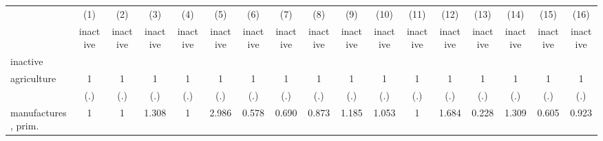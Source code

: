 {
\def\sym#1{\ifmmode^{#1}\else\(^{#1}\)\fi}
\begin{tabular}{l*{16}{c}}
\hline\hline
                    &\multicolumn{1}{c}{(1)}&\multicolumn{1}{c}{(2)}&\multicolumn{1}{c}{(3)}&\multicolumn{1}{c}{(4)}&\multicolumn{1}{c}{(5)}&\multicolumn{1}{c}{(6)}&\multicolumn{1}{c}{(7)}&\multicolumn{1}{c}{(8)}&\multicolumn{1}{c}{(9)}&\multicolumn{1}{c}{(10)}&\multicolumn{1}{c}{(11)}&\multicolumn{1}{c}{(12)}&\multicolumn{1}{c}{(13)}&\multicolumn{1}{c}{(14)}&\multicolumn{1}{c}{(15)}&\multicolumn{1}{c}{(16)}\\
                    &\multicolumn{1}{c}{inactive}&\multicolumn{1}{c}{inactive}&\multicolumn{1}{c}{inactive}&\multicolumn{1}{c}{inactive}&\multicolumn{1}{c}{inactive}&\multicolumn{1}{c}{inactive}&\multicolumn{1}{c}{inactive}&\multicolumn{1}{c}{inactive}&\multicolumn{1}{c}{inactive}&\multicolumn{1}{c}{inactive}&\multicolumn{1}{c}{inactive}&\multicolumn{1}{c}{inactive}&\multicolumn{1}{c}{inactive}&\multicolumn{1}{c}{inactive}&\multicolumn{1}{c}{inactive}&\multicolumn{1}{c}{inactive}\\
\hline
inactive            &                     &                     &                     &                     &                     &                     &                     &                     &                     &                     &                     &                     &                     &                     &                     &                     \\
agriculture         &           1         &           1         &           1         &           1         &           1         &           1         &           1         &           1         &           1         &           1         &           1         &           1         &           1         &           1         &           1         &           1         \\
                    &         (.)         &         (.)         &         (.)         &         (.)         &         (.)         &         (.)         &         (.)         &         (.)         &         (.)         &         (.)         &         (.)         &         (.)         &         (.)         &         (.)         &         (.)         &         (.)         \\
[1em]
manufactures, prim. &           1         &           1         &       1.308         &           1         &       2.986         &       0.578         &       0.690         &       0.873         &       1.185         &       1.053         &           1         &       1.684         &       0.228         &       1.309         &       0.605         &       0.923         \\

\end{tabular}}
